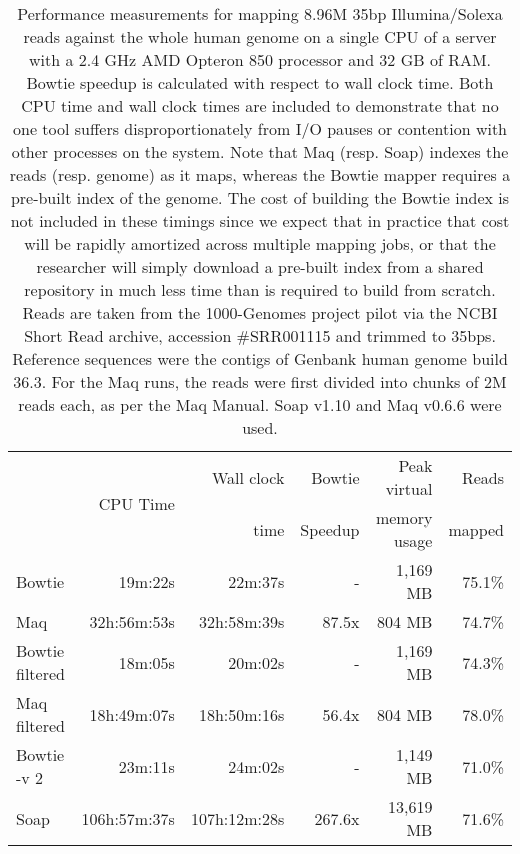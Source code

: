 \documentclass[letterpaper]{article}
\begin{document}
\begin{table}[tp]
\scriptsize
\begin{tabular}{lrrrrr}
\toprule
 & \multirow{2}{*}{CPU Time} & Wall clock & Bowtie  & Peak virtual & Reads  \\
 &                            & time       & Speedup & memory usage & mapped \\[3pt]
\toprule
\midrule
Bowtie & 19m:22s & 22m:37s & - & 1,169 MB & 75.1\%\\\midrule
Maq & 32h:56m:53s & 32h:58m:39s & 87.5x & 804 MB & 74.7\%\\\midrule
Bowtie filtered & 18m:05s & 20m:02s & - & 1,169 MB & 74.3\%\\\midrule
Maq filtered & 18h:49m:07s & 18h:50m:16s & 56.4x & 804 MB & 78.0\%\\\midrule
Bowtie -v 2 & 23m:11s & 24m:02s & - & 1,149 MB & 71.0\%\\\midrule
Soap & 106h:57m:37s & 107h:12m:28s & 267.6x & 13,619 MB & 71.6\%\\
\bottomrule
\end{tabular}
\caption{Performance measurements for mapping 8.96M 35bp Illumina/Solexa reads against the whole human genome on a single CPU of a server with a 2.4 GHz AMD Opteron 850 processor and 32 GB of RAM. Bowtie speedup is calculated with respect to wall clock time. Both CPU time and wall clock times are included to demonstrate that no one tool suffers disproportionately from I/O pauses or contention with other processes on the system. Note that Maq (resp. Soap) indexes the reads (resp. genome) as it maps, whereas the Bowtie mapper requires a pre-built index of the genome.  The cost of building the Bowtie index is not included in these timings since we expect that in practice that cost will be rapidly amortized across multiple mapping jobs, or that the researcher will simply download a pre-built index from a shared repository in much less time than is required to build from scratch. Reads are taken from the 1000-Genomes project pilot via the NCBI Short Read archive, accession \#SRR001115 and trimmed to 35bps. Reference sequences were the contigs of Genbank human genome build 36.3. For the Maq runs, the reads were first divided into chunks of 2M reads each, as per the Maq Manual. Soap v1.10 and Maq v0.6.6 were used. }
\end{table}
\end{document}
